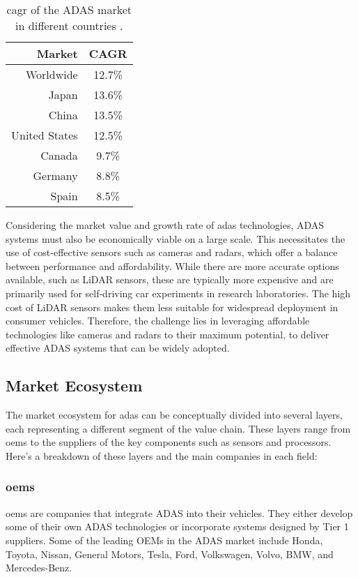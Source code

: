 \begin{table}[h]
    \centering
    \begin{tabular}{r|c}
        \hline
        \textbf{Market} & \textbf{CAGR} \\
        \hline
        Worldwide & 12.7\% \\
        Japan & 13.6\% \\
        China & 13.5\% \\
        United States & 12.5\% \\
        Canada & 9.7\% \\
        Germany & 8.8\% \\
        Spain & 8.5\% \\
        \hline
    \end{tabular}
    \caption{\ac{cagr} of the ADAS market in different countries \cite{adas_report_2023}.}
    \label{tab:adas_revenue}
\end{table}
Considering the market value and growth rate of \ac{adas} technologies, 
ADAS systems must also be economically viable on a large scale. 
This necessitates the use of cost-effective sensors such as cameras and radars, 
which offer a balance between performance and affordability. While there are 
more accurate options available, such as LiDAR sensors, these are typically more 
expensive and are primarily used for self-driving car experiments in research 
laboratories. The high cost of LiDAR sensors makes them less suitable for 
widespread deployment in consumer vehicles. Therefore, the challenge lies in 
leveraging affordable technologies like cameras and radars to their maximum 
potential, to deliver effective ADAS systems that can be widely adopted.

\subsection{Market Ecosystem}
The market ecosystem for \ac{adas} can be 
conceptually divided into several layers, each representing a different segment 
of the value chain. These layers range from \ac*{oems} to the suppliers of the key 
components such as sensors and processors. 
Here's a breakdown of these layers and the main companies in each field:

\subsubsection{\ac{oems}}
\acl{oems} are companies that integrate ADAS into their vehicles. They either develop 
some of their own ADAS technologies or incorporate systems designed by 
Tier 1 suppliers. Some of the leading OEMs in the ADAS market include 
Honda, Toyota, Nissan, General Motors, Tesla, Ford, Volkswagen, Volvo, BMW, and 
Mercedes-Benz.


